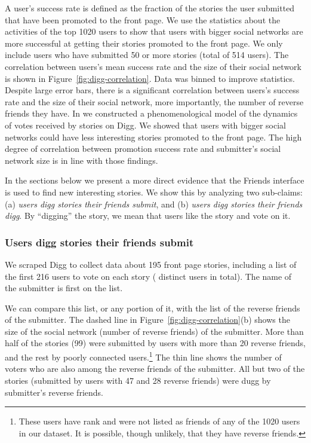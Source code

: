 \documentclass[]{article}
\newcommand{\figref}[1]{Figure~\ref{#1}}
\begin{document}
 A user's success
rate is defined as the fraction of the stories the user submitted
that have been promoted to the front page. We use the statistics
about the activities of the top 1020 users to show that users with
bigger social networks are more successful at getting their stories
promoted to the front page. We only
include users who have submitted 50 or more stories (total of 514
users). The correlation between users's mean success rate and the size of their social
network is shown in \figref{fig:digg-correlation}. Data was binned to improve statistics. Despite large error
bars, there is a significant correlation between users's success rate and the size
of their social network, more importantly, the number of
reverse friends they have. In \cite{Lerman07ic} we constructed a
phenomenological model of the dynamics of votes received by stories
on Digg. We showed that users with bigger social networks could have
less interesting stories promoted to the front page. The high degree
of correlation between promotion success rate and submitter's social
network size is in line with those findings.

In the sections below we present a more direct evidence that the Friends interface
is used to find new interesting stories. We show this by analyzing two
sub-claims: (a) \emph{users digg stories their friends submit}, and
(b) \emph{users digg stories their friends digg}.
By ``digging'' the story, we mean that users like the story and vote on it.

\subsubsection{Users digg stories their friends submit} We scraped Digg to collect
data about 195 front page stories, including a list of the first 216 users to vote
on each story ( distinct users in total). The name of the submitter
is first on the list.


We can compare this list, or any portion
of it, with the list of the reverse friends of the submitter.
The dashed line in \figref{fig:digg-correlation}(b) shows the size of the social
network (number of reverse friends) of the submitter. More than half
of the stories (99) were submitted by users with more than 20
reverse friends, and the rest by poorly connected users.\footnote{These users
have rank  and were not listed as friends of any of the 1020
users in our dataset. It is possible, though unlikely, that they
have reverse friends.}
The thin line  shows the number of voters
who are also among the reverse friends of the submitter.
All but two of the stories (submitted by users with
47 and 28 reverse friends) were dugg by submitter's reverse friends.
\end{document}
